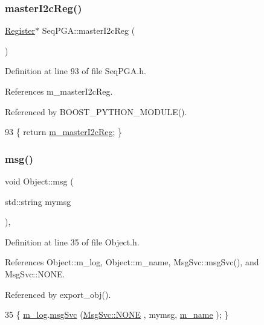 \subsubsection{\texorpdfstring{master\+I2c\+Reg()}{masterI2cReg()}}
{\footnotesize\ttfamily \hyperlink{classRegister}{Register}$\ast$ Seq\+P\+G\+A\+::master\+I2c\+Reg (\begin{DoxyParamCaption}{ }\end{DoxyParamCaption})\hspace{0.3cm}{\ttfamily [inline]}}



Definition at line 93 of file Seq\+P\+G\+A.\+h.



References m\+\_\+master\+I2c\+Reg.



Referenced by B\+O\+O\+S\+T\+\_\+\+P\+Y\+T\+H\+O\+N\+\_\+\+M\+O\+D\+U\+L\+E().


\begin{DoxyCode}
93 \{ \textcolor{keywordflow}{return} \hyperlink{classSeqPGA_a942c71b33a4f43b7a994cb9216abb17e}{m\_masterI2cReg}; \}
\end{DoxyCode}
\mbox{\label{classObject_a58b2d0618c2d08cf2383012611528d97}} 
\subsubsection{\texorpdfstring{msg()}{msg()}\hspace{0.1cm}{\footnotesize\ttfamily [1/2]}}
{\footnotesize\ttfamily void Object\+::msg (\begin{DoxyParamCaption}\item[{std\+::string}]{mymsg }\end{DoxyParamCaption})\hspace{0.3cm}{\ttfamily [inline]}, {\ttfamily [inherited]}}



Definition at line 35 of file Object.\+h.



References Object\+::m\+\_\+log, Object\+::m\+\_\+name, Msg\+Svc\+::msg\+Svc(), and Msg\+Svc\+::\+N\+O\+NE.



Referenced by export\+\_\+obj().


\begin{DoxyCode}
35 \{ \hyperlink{classObject_a0d269813dd7ac1f24bc143031e2963f2}{m\_log}.\hyperlink{classMsgSvc_ad25f18047920cc59a314e5098259711c}{msgSvc} (\hyperlink{classMsgSvc_ae671eb7301996cd049d2da8a65925926a9be9ae32fed8e1e6eba4a58692210fbd}{MsgSvc::NONE}    , mymsg, \hyperlink{classObject_a8b83c95c705d2c3ba0d081fe1710f48d}{m\_name} ); \}
\end{DoxyCode}
\mbox{\label{classObject_ac5d59299273cee27aacf7de00d2e7034}} 
